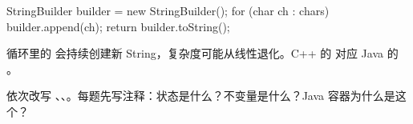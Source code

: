 \begin{javacode}
StringBuilder builder = new StringBuilder();
for (char ch : chars) {
    builder.append(ch);
}
return builder.toString();
\end{javacode}

循环里的  会持续创建新 String，复杂度可能从线性退化。C++ 的  对应 Java 的 。

\begin{drill}
依次改写 、、。每题先写注释：状态是什么？不变量是什么？Java 容器为什么是这个？
\end{drill}
